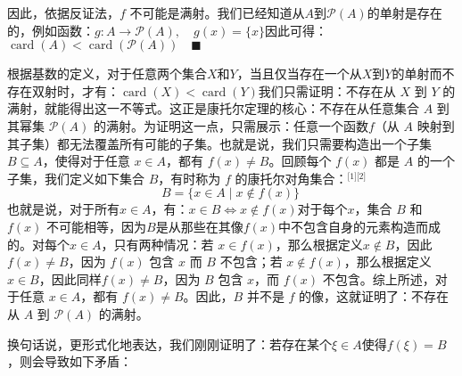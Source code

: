 因此，依据反证法，$f$ 不可能是满射。我们已经知道从$A$到$\mathcal{P}(A)$的单射是存在的，例如函数：$g: A \to \mathcal{P}(A), \quad g(x) = \{x\}$因此可得：$\operatorname{card}(A) < \operatorname{card}(\mathcal{P}(A)) \quad \blacksquare$

根据基数的定义，对于任意两个集合$X$和$Y$，当且仅当存在一个从$X$到$Y$的单射而不存在双射时，才有：$\operatorname{card}(X) < \operatorname{card}(Y)$我们只需证明：不存在从 $X$ 到 $Y$ 的满射，就能得出这一不等式。这正是康托尔定理的核心：不存在从任意集合 $A$ 到其幂集 $\mathcal{P}(A)$ 的满射。为证明这一点，只需展示：任意一个函数$f$（从 $A$ 映射到其子集）都无法覆盖所有可能的子集。也就是说，我们只需要构造出一个子集 $B \subseteq A$，使得对于任意 $x \in A$，都有 $f(x) \neq B$。回顾每个 $f(x)$ 都是 $A$ 的一个子集，我们定义如下集合 $B$，有时称为 $f$ 的康托尔对角集合：\(^\text{[1][2]}\)
$$
B = \{x \in A \mid x \notin f(x)\}~
$$
也就是说，对于所有$x \in A$，有：$x \in B \iff x \notin f(x)$对于每个$x$，集合 $B$ 和 $f(x)$ 不可能相等，因为$B$是从那些在其像$f(x)$中不包含自身的元素构造而成的。对每个$x \in A$，只有两种情况：若 $x \in f(x)$，那么根据定义$x \notin B$，因此$f(x) \neq B$，因为 $f(x)$ 包含 $x$ 而 $B$ 不包含；若 $x \notin f(x)$，那么根据定义 $x \in B$，因此同样$f(x)\neq B$，因为 $B$ 包含 $x$，而 $f(x)$ 不包含。综上所述，对于任意 $x \in A$，都有 $f(x) \neq B$。因此，$B$ 并不是 $f$ 的像，这就证明了：不存在从 $A$ 到 $\mathcal{P}(A)$ 的满射。

换句话说，更形式化地表达，我们刚刚证明了：若存在某个$\xi \in A$使得$f(\xi) = B$，则会导致如下矛盾：
